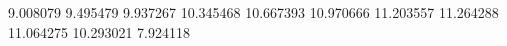 9.008079
9.495479
9.937267
10.345468
10.667393
10.970666
11.203557
11.264288
11.064275
10.293021
7.924118

